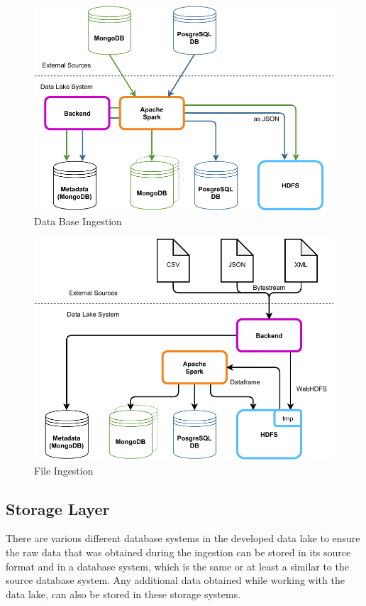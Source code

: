 \documentclass[conference]{IEEEtran}
\begin{document}
\begin{figure}[h]
\centerline{\includegraphics[scale=0.65]{graphics/db_ingestion.pdf}}
\caption{Data Base Ingestion}
\label{DBI}
\end{figure}

\begin{figure}[h]
\centerline{\includegraphics[scale=0.65]{graphics/file_ingestion.pdf}}
\caption{File Ingestion}
\label{FI}
\end{figure}

\subsection{Storage Layer}\label{STL}
There are various different database systems in the developed data lake to ensure the raw data
that was obtained during the ingestion can be stored in its source format and in a database system,
which is the same or at least a similar to the source database system. 
Any additional data obtained while working with the data lake, can also be stored in these storage 
systems. 
\end{document}
